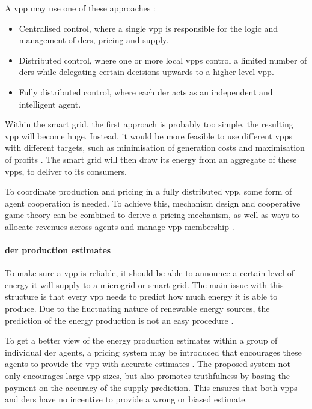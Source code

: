 A \ac{vpp} may use one of these approaches \cite{NikonowiczMilewski2012}:
\begin{itemize}
	\item Centralised control, where a single \ac{vpp} is responsible for the logic and management of \acp{der}, pricing and supply.
	\item Distributed control, where one or more local \acp{vpp} control a limited number of \acp{der} while delegating certain decisions upwards to a higher level \ac{vpp}.
	\item Fully distributed control, where each \ac{der} acts as an independent and intelligent agent.
\end{itemize}

Within the smart grid, the first approach is probably too simple, the resulting \ac{vpp} will become huge. Instead, it would be more feasible to use different \acp{vpp} with different targets, such as minimisation of generation costs and maximisation of profits \cite{LombardiPowalkoRudion2009}. The smart grid will then draw its energy from an aggregate of these \acp{vpp}, to deliver to its consumers. 

To coordinate production and pricing in a fully distributed \ac{vpp}, some form of agent cooperation is needed. To achieve this, mechanism design and cooperative game theory can be combined to derive a pricing mechanism, as well as ways to allocate revenues across agents and manage \ac{vpp} membership \cite{ChalkiadakisRobuKotaEtAl2011}. 

\paragraph{\acl{der} production estimates}
To make sure a \ac{vpp} is reliable, it should be able to announce a certain level of energy it will supply to a microgrid or smart grid. The main issue with this structure is that every \ac{vpp} needs to predict how much energy it is able to produce. Due to the fluctuating nature of renewable energy sources, the prediction of the energy production is not an easy procedure \cite{LombardiPowalkoRudion2009}.  

To get a better view of the energy production estimates within a group of individual \ac{der} agents, a pricing system  may be introduced that encourages these agents to provide the \ac{vpp} with accurate estimates \cite{ChalkiadakisRobuKotaEtAl2011}. The proposed system not only encourages large \ac{vpp} sizes, but also promotes truthfulness by basing the payment on the accuracy of the supply prediction. This ensures that both \acp{vpp} and \acp{der} have no incentive to provide a wrong or biased estimate.

